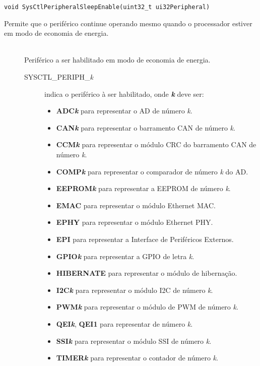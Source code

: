 \begin{lstlisting}[style=funcao]
	void SysCtlPeripheralSleepEnable(uint32_t ui32Peripheral)
\end{lstlisting}

Permite que o periférico continue operando mesmo quando o processador estiver em modo de economia de energia.

\begin{description}
	\item []\hfill \\
	Periférico a ser habilitado em modo de economia de energia.
	\begin{description}
		\item [SYSCTL\_PERIPH\_\emph{k}] indica o periférico à ser habilitado, onde \textbf{\emph{k}} deve ser:
		\begin{itemize}
			\item \textbf{ADC\emph{k}} para representar o AD de número \emph{k}.
			\item \textbf{CAN\emph{k}} para representar o barramento CAN de número \emph{k}.
			\item \textbf{CCM\emph{k}} para representar o módulo CRC do barramento CAN de número \emph{k}.
			\item \textbf{COMP\emph{k}} para representar o comparador de número \emph{k} do AD.
			\item \textbf{EEPROM\emph{k}} para representar a EEPROM de número \emph{k}.
			\item \textbf{EMAC} para representar o módulo Ethernet MAC.
			\item \textbf{EPHY} para representar o módulo Ethernet PHY.
			\item \textbf{EPI} para representar a Interface de Periféricos Externos.
			\item \textbf{GPIO\emph{k}} para representar a GPIO de letra \emph{k}.
			\item \textbf{HIBERNATE} para representar o módulo de hibernação.
			\item \textbf{I2C\emph{k}} para representar o módulo I2C de número \emph{k}.
			\item \textbf{PWM\emph{k}} para representar o módulo de PWM de número \emph{k}.
			\item \textbf{QEI\emph{k}}, \textbf{QEI1} para representar  de número \emph{k}.
			\item \textbf{SSI\emph{k}} para representar o módulo SSI de número \emph{k}.
			\item \textbf{TIMER\emph{k}} para representar o contador de número \emph{k}.

\end{itemize}
\end{description}
\end{description}
